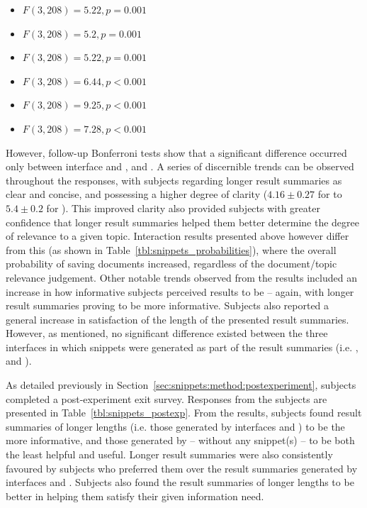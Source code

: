 \begin{itemize}
    \item{ $F(3,208)=5.22, p=0.001$}
    \item{ $F(3,208)=5.2, p=0.001$}
    \item{ $F(3,208)=5.22, p=0.001$}
    \item{ $F(3,208)=6.44, p<0.001$}
    \item{ $F(3,208)=9.25, p<0.001$}
    \item{ $F(3,208)=7.28, p<0.001$}
\end{itemize}

However, follow-up Bonferroni tests show that a significant difference occurred only between interface  and ,  and . A series of discernible trends can be observed throughout the responses, with subjects regarding longer result summaries as clear and concise, and possessing a higher degree of clarity ($4.16\pm0.27$ for  to $5.4\pm0.2$ for ). This improved clarity also provided subjects with greater confidence that longer result summaries helped them better determine the degree of relevance to a given topic. Interaction results presented above however differ from this (as shown in Table~\ref{tbl:snippets_probabilities}), where the overall probability of saving documents increased, regardless of the document/topic relevance judgement. Other notable trends observed from the results included an increase in how informative subjects perceived results to be -- again, with longer result summaries proving to be more informative. Subjects also reported a general increase in satisfaction of the length of the presented result summaries. However, as mentioned, no significant difference existed between the three interfaces in which snippets were generated as part of the result summaries (i.e. ,  and ).

As detailed previously in Section~\ref{sec:snippets:method:postexperiment}, subjects completed a post-experiment exit survey. Responses from the subjects are presented in Table~\ref{tbl:snippets_postexp}. From the results, subjects found result summaries of longer lengths (i.e. those generated by interfaces  and ) to be the more informative, and those generated by  -- without any snippet(s) -- to be both the least helpful and useful. Longer result summaries were also consistently favoured by subjects who preferred them over the result summaries generated by interfaces  and . Subjects also found the result summaries of longer lengths to be better in helping them satisfy their given information need.

